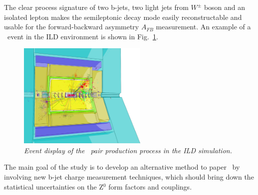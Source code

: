 The clear process signature of two b-jets, two light jets from $W^\pm$ boson and an isolated lepton makes the semileptonic decay mode easily reconstructable and usable for the forward-backward asymmetry $A_{FB}$ measurement. 
An example of a \ttbar\ event in the ILD environment is shown in Fig.~\ref{fig:TopEvent_3}.

\begin{figure}
	{\centering
		\includegraphics[clip, trim=0.cm 0cm 7.9cm 0cm, width=0.55\textwidth]{ILD/graphics/ild-ttbar.png}
		\caption{\sl Event display of the \ttbar\ pair production process in the ILD simulation.
		}
		\label{fig:TopEvent_3}
	}
	
\end{figure}

The main goal of the study is to develop an alternative method to paper~\cite{bib:ILCTOP} by involving new b-jet charge measurement techniques, which should bring down the statistical uncertainties on the \ttbar Z$^0$ form factors and couplings.  


